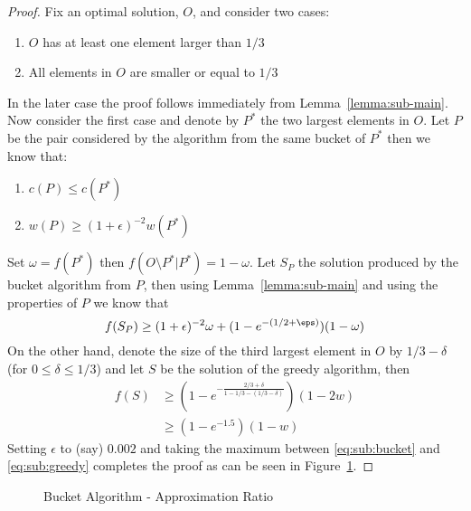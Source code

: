 \begin{proof}
Fix an optimal solution, $O$, and consider two cases:
\begin{enumerate}
  \item $O$ has at least one element larger than $1/3$
  \item All elements in $O$ are smaller or equal to $1/3$
\end{enumerate}
In the later case the proof follows immediately from Lemma~\ref{lemma:sub-main}.
Now consider the first case and denote by $P^*$ the two largest elements in $O$.
Let $P$ be the pair considered by the algorithm from the same bucket of $P^*$ then we know
that:
\begin{enumerate}
  \item $c(P) \leq c(P^*)$
  \item $w(P) \geq (1 + \epsilon)^{-2}w(P^*)$
\end{enumerate}
Set $\omega = f(P^*)$ then $f(O\setminus P^* | P^*) = 1 - \omega$.
Let $S_P$ the solution produced by the bucket algorithm from $P$, 
then using Lemma~\ref{lemma:sub-main} and using the properties of $P$ we know that
\begin{equation}
\label{eq:sub:bucket}
f(S_P) \geq (1 + \epsilon)^{-2}\omega + (1-e^{-(1/2 + \eps)})(1 - \omega)
\end{equation}
On the other hand, denote the size of the third largest element in $O$ by $1/3 - \delta$
(for $0 \leq \delta \leq 1/3$) and  let $S$ be the solution of the greedy algorithm, then 
\begin{align}
\label{eq:sub:greedy}
f(S) & \geq (1 - e^{-\frac{2/3 + \delta}{1 - 1/3 - (1/3 - \delta)}})(1 - 2w) 
\\
& \geq (1 - e^{-1.5})(1-w)
\end{align}
Setting $\epsilon$ to (say) $0.002$ and taking the maximum between \ref{eq:sub:bucket} and
\ref{eq:sub:greedy} completes the proof as can be seen in Figure~\ref{fig:sub:bucket}.
\end{proof}

\begin{figure}
\def\zeta{0.002}
\caption{
\label{fig:sub:bucket}
Bucket Algorithm - Approximation Ratio
}
\end{figure}
